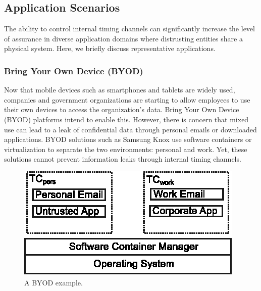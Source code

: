 
\subsection{Application Scenarios}

The ability to control internal timing channels can significantly increase the
level of
assurance in diverse application domains where distrusting entities share a
physical system. Here, we briefly discuss representative applications.

\subsubsection{Bring Your Own Device (BYOD)}

Now that mobile devices such as smartphones and tablets are widely used, 
companies and government organizations are starting to allow employees to
use their own devices to access the organization's data.
Bring Your Own Device (BYOD) platforms intend to enable this. However, there is 
concern that mixed use can lead to a leak of confidential data through personal 
emails or
downloaded applications. BYOD solutions such as Samsung Knox use
software containers or virtualization to separate the two environments:
personal and work. Yet, these solutions cannot prevent information leaks
through internal timing channels.

\begin{figure}
    \begin{center}
        \includegraphics{figs/byod.eps}
        \caption{A BYOD example.}
        \label{fig:byod}
    \end{center}
\end{figure}


